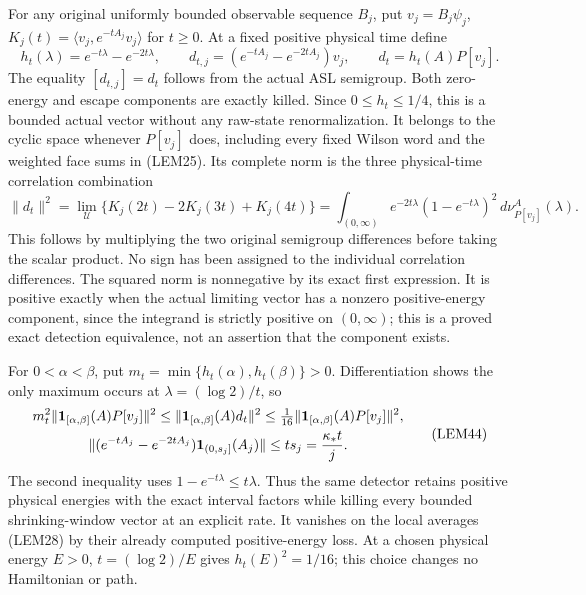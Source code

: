 \documentclass[11pt]{article}
\begin{document}
For any original uniformly bounded observable sequence \(B_j\), put \(v_j=B_j\psi_j\), \(K_j(t)=\langle v_j,e^{-tA_j}v_j\rangle\) for \(t\ge0\). At a fixed positive physical time define
\[
h_t(\lambda)=e^{-t\lambda}-e^{-2t\lambda},\qquad
d_{t,j}=(e^{-tA_j}-e^{-2tA_j})v_j,\qquad
d_t=h_t(A)P[v_j].
\tag{LEM42}
\]
The equality \([d_{t,j}]=d_t\) follows from the actual ASL semigroup. Both zero-energy and escape components are exactly killed. Since \(0\le h_t\le1/4\), this is a bounded actual vector without any raw-state renormalization. It belongs to the cyclic space whenever \(P[v_j]\) does, including every fixed Wilson word and the weighted face sums in (LEM25). Its complete norm is the three physical-time correlation combination
\[
\|d_t\|^2=\lim_{\mathcal U}
 \{K_j(2t)-2K_j(3t)+K_j(4t)\}
=\int_{(0,\infty)}e^{-2t\lambda}(1-e^{-t\lambda})^2
                      \,d\nu_{P[v_j]}^A(\lambda).
\tag{LEM43}
\]
This follows by multiplying the two original semigroup differences before taking the scalar product. No sign has been assigned to the individual correlation differences. The squared norm is nonnegative by its exact first expression. It is positive exactly when the actual limiting vector has a nonzero positive-energy component, since the integrand is strictly positive on \((0,\infty)\); this is a proved exact detection equivalence, not an assertion that the component exists.

For \(0<\alpha<\beta\), put \(m_t=\min\{h_t(\alpha),h_t(\beta)\}>0\). Differentiation shows the only maximum occurs at \(\lambda=(\log2)/t\), so
\[
\begin{gathered}
m_t^2\|\mathbf1_{[\alpha,\beta]}(A)P[v_j]\|^2
\le\|\mathbf1_{[\alpha,\beta]}(A)d_t\|^2
\le\tfrac1{16}\|\mathbf1_{[\alpha,\beta]}(A)P[v_j]\|^2,\\
\|(e^{-tA_j}-e^{-2tA_j})\mathbf1_{(0,s_j]}(A_j)\|
\le ts_j={\kappa_*t\over j}.
\end{gathered}\tag{LEM44}
\]
The second inequality uses \(1-e^{-t\lambda}\le t\lambda\). Thus the same detector retains positive physical energies with the exact interval factors while killing every bounded shrinking-window vector at an explicit rate. It vanishes on the local averages (LEM28) by their already computed positive-energy loss. At a chosen physical energy \(E>0\), \(t=(\log2)/E\) gives \(h_t(E)^2=1/16\); this choice changes no Hamiltonian or path.
\end{document}
